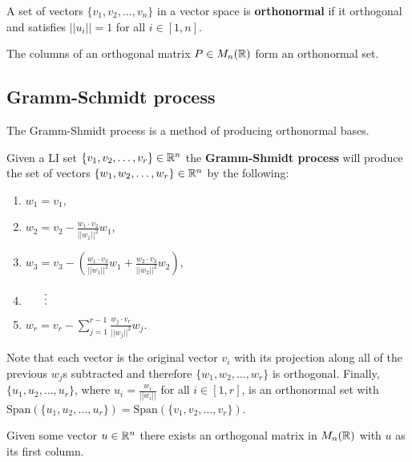\documentclass[../Year1.tex]{subfiles}
\begin{document}
\begin{definition}
    A set of vectors $\{v_1,v_2,\ldots,v_n\}$ in a vector space is \textbf{orthonormal} if it orthogonal and satisfies $||u_i||=1$ for all $i\in[1,n]$.
\end{definition}

\begin{theorem}
    The columns of an orthogonal matrix $P\in M_n(\mathbb{R})$ form an orthonormal set.
\end{theorem}

\subsection{Gramm-Schmidt process}
The Gramm-Shmidt process is a method of producing orthonormal bases.
\begin{algorithm}
    Given a LI set $\{v_1,v_2,\ldots,v_r\} \in \mathbb{R}^n$ the \textbf{Gramm-Shmidt process} will produce the set of vectors $\{w_1,w_2,\ldots,w_r\} \in \mathbb{R}^n$ by the following:
    \begin{samepage}
    \begin{enumerate}
        \item[] $\displaystyle w_1 = v_1$,
        \item[] $\displaystyle w_2 = v_2 - \frac{w_1\cdot v_2}{||w_1||^2}w_1$,
        \item[] $\displaystyle w_3 = v_3 - \left(\frac{w_1\cdot v_3}{||w_1||^2}w_1 + \frac{w_2\cdot v_3}{||w_2||^2}w_2\right)$,
        \item[] $\hspace{16.5pt}\vdots$
        \item[] $\displaystyle w_r = v_r - \sum_{j=1}^{r-1}\frac{w_j\cdot v_r}{||w_j||^2}w_j$.
    \end{enumerate}
    \end{samepage}
    Note that each vector is the original vector $v_i$ with its projection along all of the previous $w_j$s subtracted and therefore $\{w_1,w_2,\ldots,w_r\}$ is orthogonal. Finally, $\{u_1,u_2,\ldots,u_r\}$, where $\displaystyle u_i = \frac{w_i}{||w_i||}$ for all $i\in[1,r]$, is an orthonormal set with $\text{Span}(\{u_1,u_2,\ldots,u_r\}) = \text{Span}(\{v_1,v_2,\ldots,v_r\})$.
\end{algorithm}

\begin{corollary}
    Given some vector $u\in\mathbb{R}^n$ there exists an orthogonal matrix in $M_n(\mathbb{R})$ with $u$ as its first column.
\end{corollary}
\end{document}
